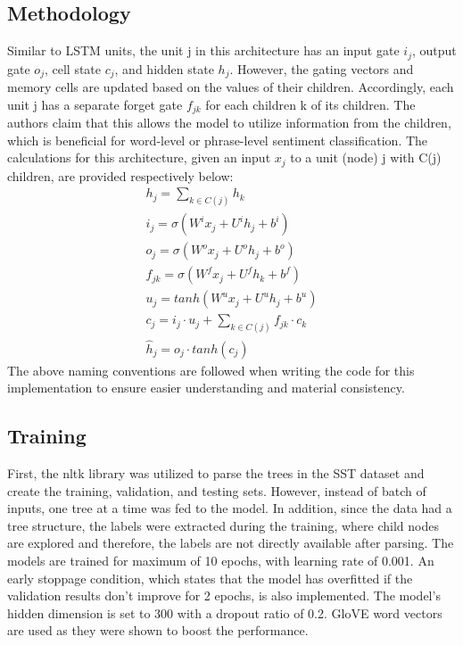 \documentclass[12pt,a4paper]{article}
\begin{document}
	\vspace{-0.4cm}
	\subsection{Methodology}
	Similar to LSTM units, the unit j in this architecture has an input gate $i_j$, output gate $o_j$, cell state $c_j$, and hidden state $h_j$. However, the gating vectors and memory cells are updated based on the values of their children. Accordingly, each unit j has a separate forget gate $f_{jk}$ for each children k of its children. The authors claim that this allows the model to utilize information from the children, which is beneficial for word-level or phrase-level sentiment classification. The calculations for this architecture, given an input $x_j$ to a unit (node) j with C(j) children, are provided respectively below:
	\vspace{-0.2cm}
	\begin{equation}
		\begin{aligned}
			h_j = \sum_{k\in C(j)}h_k \qquad \quad \\
			i_j = \sigma(W^ix_j+U^ih_j+b^i) \\
			o_j = \sigma(W^ox_j+U^oh_j+b^o)\\
			f_{jk} = \sigma(W^fx_j+U^fh_k+b^f) \\
			u_j = tanh(W^ux_j+U^uh_j+b^u) \\
			c_j = i_j \cdot u_j + \sum_{k\in C(j)}f_{jk} \cdot c_k\\
			\hat{h}_j = o_j \cdot tanh(c_j)\quad
		\end{aligned}
	\end{equation}
	The above naming conventions are followed when writing the code for this implementation to ensure easier understanding and material consistency.
	
	\subsection{Training}
	First, the nltk library was utilized to parse the trees in the SST dataset and create the training, validation, and testing sets. However, instead of batch of inputs, one tree at a time was fed to the model. In addition, since the data had a tree structure, the labels were extracted during the training, where child nodes are explored and therefore, the labels are not directly available after parsing. The models are trained for maximum of 10 epochs, with learning rate of 0.001. An early stoppage condition, which states that the model has overfitted if the validation results don't improve for 2 epochs, is also implemented. The model's hidden dimension is set to 300 with a dropout ratio of 0.2. GloVE word vectors are used as they were shown to boost the performance.
	
\end{document}
